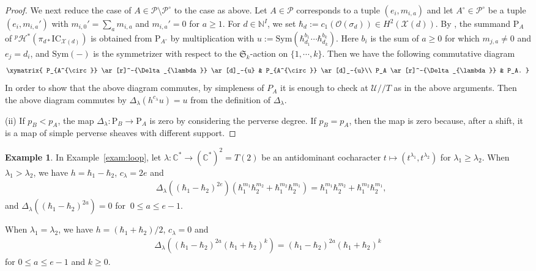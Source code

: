 \documentclass [11pt,oneside,a4paper,mathscr]{amsart}
\theoremstyle{definition}
\newtheorem{example}[thm]{Example}
\renewcommand{\leq}{\leqslant}
\renewcommand{\geq}{\geqslant}
\newcommand{\X}{\mathscr{X}}
\newcommand{\ssslash}{/\!\!/}
\begin{document}
\begin{proof}
We next reduce the case of $A \in \mathscr{P} \setminus \mathscr{P}^{\circ}$
to the case as above. 
Let $A \in \mathscr{P}$ corresponds to 
a tuple $(e_i, m_{i, a})$ and let $A^{\circ} \in \mathscr{P}^{\circ}$ be 
a tuple $(e_i, m_{i, a}')$ with $m_{i, 0}'=\sum_{a}m_{i, a}$ and $m_{i, a}'=0$ for $a\geq 1$. 
For $d\in \mathbb{N}^I$, we set $\hbar_d:=c_1(\mathcal{O}(\sigma_d))\in H^2(\X(d))$.
By \cite[Theorem C]{DM},
the summand $\mathrm{P}_{A}$ of ${}^p\mathcal{H}^{\ast}\left(\pi_{d*}\mathrm{IC}_{\X(d)}\right)$ is obtained from $\mathrm{P}_{A^{\circ}}$
by multiplication with 
$u :=\mathrm{Sym}(\hbar_{d_1}^{b_1} \cdots \hbar_{d_k}^{b_k})$. 
Here $b_i$ is the sum of $a \geq 0$ for which 
$m_{j, a} \neq 0$ and $e_j=d_i$, and $\mathrm{Sym}(-)$ is the symmetrizer with respect to the 
$\mathfrak{S}_k$-action on $\{1, \cdots, k\}$. 
Then we have the following commutative diagram 
\begin{align*}
    \xymatrix{
P_{A^{\circ}} \ar[r]^-{\Delta_{\lambda}} \ar[d]_-{u}  & P_{A^{\circ}} \ar[d]_-{u}\\
P_A \ar[r]^-{\Delta_{\lambda}} & P_A.   
    }
\end{align*}
In order to show that the above diagram commutes, by simpleness of $P_A$ it is 
enough to check at $\mathcal{U}\ssslash T$ as in the above arguments. 
Then the above diagram commutes by
$\Delta_{\lambda}(h^{c_{\lambda}}u)=u$
from the definition of $\Delta_{\lambda}$. 

    (ii) If $p_B<p_A$, the map $\Delta_\lambda\colon\mathrm{P}_B\to\mathrm{P}_A$ is zero by considering the perverse degree. If $p_B=p_A$, then the map is zero because, after a shift, it is a map of simple perverse sheaves with different support. 
\end{proof}


\begin{example}\label{example:nabla}
In Example~\ref{exam:loop},
let $\lambda \colon \mathbb{C}^{\ast} \to (\mathbb{C}^{\ast})^2=T(2)$
be an antidominant cocharacter $t\mapsto (t^{\lambda_1}, t^{\lambda_2})$
for $\lambda_1 \geq \lambda_2$. 
When $\lambda_1>\lambda_2$, we have $h=\hbar_1-\hbar_2$, $c_{\lambda}=2e$ and  
\begin{align*}
    &\Delta_{\lambda}((\hbar_1-\hbar_2)^{2e})(\hbar_1^{m_1} \hbar_2^{m_2}+\hbar_1^{m_2} \hbar_2^{m_1})
    =\hbar_1^{m_1} \hbar_2^{m_2}+\hbar_1^{m_2} \hbar_2^{m_1}, 
    \end{align*}
    and $\Delta_{\lambda}((\hbar_1-\hbar_2)^{2a})=0$ for $\ 0\leq a \leq e-1$. 
    
When $\lambda_1=\lambda_2$, we have $h=(\hbar_1+\hbar_2)/2$, $c_{\lambda}=0$ and 
\begin{align*}
\Delta_{\lambda}((\hbar_1-\hbar_2)^{2a}(\hbar_1+\hbar_2)^k)=(\hbar_1-\hbar_2)^{2a}(\hbar_1+\hbar_2)^k
\end{align*}
for $0\leq a\leq e-1$ and $k\geq 0$.     
\end{example}
\end{document}
